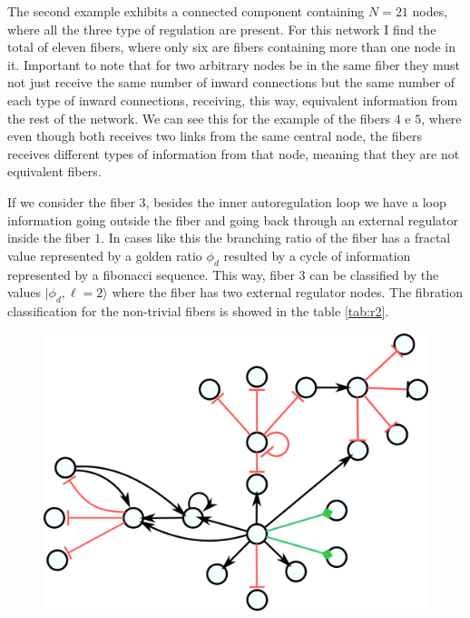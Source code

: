 \documentclass[12pt]{diazessay} %
\begin{document}
The second example exhibits a connected component containing $N = 21$ nodes, where all the three type of regulation are present. For this network I find the total of eleven fibers, where only six are fibers containing more than one node in it. Important to note that for two arbitrary nodes be in the same fiber they must not just receive the same number of inward connections but the same number of each type of inward connections, receiving, this way, equivalent information from the rest of the network. We can see this for the example of the fibers $4$ e $5$, where even though both receives two links from the same central node, the fibers receives different types of information from that node, meaning that they are not equivalent fibers.

If we consider the fiber $3$, besides the inner autoregulation loop we have a loop information going outside the fiber and going back through an external regulator inside the fiber $1$. In cases like this the branching ratio of the fiber has a fractal value represented by a golden ratio $\phi_d$ resulted by a cycle of information represented by a fibonacci sequence. This way, fiber $3$ can be classified by the values $| \phi_d, \ell = 2 \rangle$ where the fiber has two external regulator nodes. The fibration classification for the non-trivial fibers is showed in the table \ref{tab:r2}.


\begin{figure}[H]
	\centering
	\includegraphics[scale=0.3]{Figures/result2.png}
\end{figure}
\end{document}
